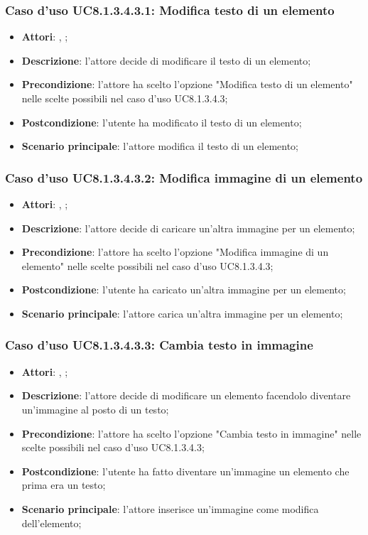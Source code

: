 		\subsubsection{Caso d'uso UC8.1.3.4.3.1: Modifica testo di un elemento}
		\label{UC8.1.3.4.3.1}
		\begin{itemize}
			\item \textbf{Attori}: \uau, \uaupro;
			\item \textbf{Descrizione}: l'attore decide di modificare il testo di un elemento;
			\item \textbf{Precondizione}: l'attore ha scelto l'opzione "Modifica testo di un elemento" nelle scelte possibili nel caso d'uso UC8.1.3.4.3;
			\item \textbf{Postcondizione}: l'utente ha modificato il testo di un elemento;
			\item \textbf{Scenario principale}: l'attore modifica il testo di un elemento;  
		\end{itemize}
		
		\subsubsection{Caso d'uso UC8.1.3.4.3.2: Modifica immagine di un elemento}
		\label{UC8.1.3.4.3.2}
		\begin{itemize}
			\item \textbf{Attori}: \uau, \uaupro;
			\item \textbf{Descrizione}: l'attore decide di caricare un'altra immagine per un elemento;
			\item \textbf{Precondizione}: l'attore ha scelto l'opzione "Modifica immagine di un elemento" nelle scelte possibili nel caso d'uso UC8.1.3.4.3;
			\item \textbf{Postcondizione}: l'utente ha caricato un'altra immagine per un elemento;
			\item \textbf{Scenario principale}: l'attore carica un'altra immagine per un elemento;
		\end{itemize}
		
		\subsubsection{Caso d'uso UC8.1.3.4.3.3: Cambia testo in immagine}
		\label{UC8.1.3.4.3.3}
		\begin{itemize}
			\item \textbf{Attori}: \uau, \uaupro;
			\item \textbf{Descrizione}: l'attore decide di modificare un elemento facendolo diventare un'immagine al posto di un testo;
			\item \textbf{Precondizione}: l'attore ha scelto l'opzione "Cambia testo in immagine" nelle scelte possibili nel caso d'uso UC8.1.3.4.3;
			\item \textbf{Postcondizione}: l'utente ha fatto diventare un'immagine un elemento che prima era un testo;
			\item \textbf{Scenario principale}: l'attore inserisce un'immagine come modifica dell'elemento;  
		\end{itemize}
		

